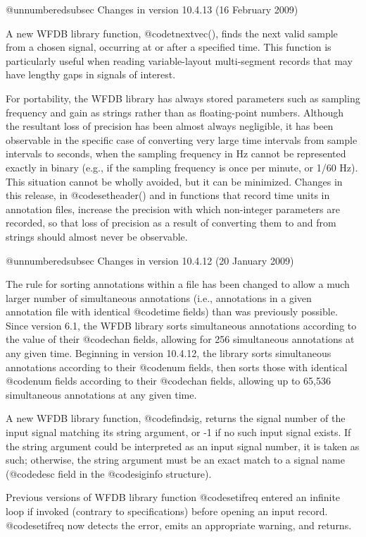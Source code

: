 {{{{{{{{@unnumberedsubsec Changes in version 10.4.13 (16 February 2009)

A new WFDB library function, @code{tnextvec()}, finds the next valid sample
from a chosen signal, occurring at or after a specified time.  This
function is particularly useful when reading variable-layout
multi-segment records that may have lengthy gaps in signals of interest.

For portability, the WFDB library has always stored parameters such as
sampling frequency and gain as strings rather than as floating-point
numbers.  Although the resultant loss of precision has been almost
always negligible, it has been observable in the specific case of
converting very large time intervals from sample intervals to seconds,
when the sampling frequency in Hz cannot be represented exactly in
binary (e.g., if the sampling frequency is once per minute, or 1/60
Hz).  This situation cannot be wholly avoided, but it can be
minimized.  Changes in this release, in @code{setheader()} and in functions
that record time units in annotation files, increase the precision
with which non-integer parameters are recorded, so that loss of
precision as a result of converting them to and from strings should
almost never be observable.

@unnumberedsubsec Changes in version 10.4.12 (20 January 2009)

The rule for sorting annotations within a file has been changed to allow a much
larger number of simultaneous annotations (i.e., annotations in a given
annotation file with identical @code{time} fields) than was previously
possible.  Since version 6.1, the WFDB library sorts simultaneous annotations
according to the value of their @code{chan} fields, allowing for 256
simultaneous annotations at any given time.  Beginning in version 10.4.12, the
library sorts simultaneous annotations according to their @code{num} fields,
then sorts those with identical @code{num} fields according to their
@code{chan} fields, allowing up to 65,536 simultaneous annotations at any given
time.

A new WFDB library function, @code{findsig}, returns the signal number of the
input signal matching its string argument, or -1 if no such input signal
exists.  If the string argument could be interpreted as an input signal number,
it is taken as such; otherwise, the string argument must be an exact match to a
signal name (@code{desc} field in the @code{siginfo} structure).

Previous versions of WFDB library function @code{setifreq} entered an infinite
loop if invoked (contrary to specifications) before opening an input record.
@code{setifreq} now detects the error, emits an appropriate warning, and
returns.

}}}}}}}}
